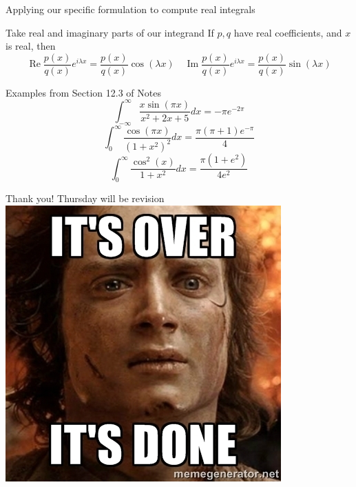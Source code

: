 \documentclass{beamer}
\DeclareMathOperator{\Real}{Re}
\DeclareMathOperator{\Imag}{Im}
\begin{document}
\begin{frame}{Applying our specific formulation to compute real integrals}

\begin{block}{Take real and imaginary parts of our integrand}
If $p,q$ have real coefficients, and $x$ is real, then
$$\Real \frac{p(x)}{q(x)}e^{i\lambda x}=\frac{p(x)}{q(x)}\cos(\lambda x)\quad \Imag \frac{p(x)}{q(x)}e^{i\lambda x}=\frac{p(x)}{q(x)}\sin(\lambda x)$$
\end{block}
\begin{block}{Examples from Section 12.3 of Notes}
$$\int_{-\infty}^\infty \frac{x\sin(\pi x)}{x^2+2x+5}dx=-\pi e^{-2\pi}$$
$$\int_0^\infty \frac{\cos(\pi x)}{(1+x^2)^2}dx=\frac{\pi(\pi+1)e^{-\pi}}{4}$$
$$\int_{0}^\infty \frac{\cos^2(x)}{1+x^2}dx=\frac{\pi(1+e^2)}{4e^2}$$





\end{block}
\end{frame}
\begin{frame}{Thank you!  Thursday will be revision}
\center
\includegraphics[width=\textwidth,height=.9\textheight,keepaspectratio]{ItsOver.jpg}

\end{frame}
\end{document}

